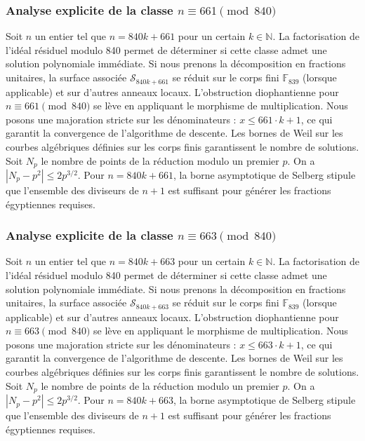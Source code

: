 \documentclass[11pt,a4paper]{article}
\begin{document}
\subsubsection{Analyse explicite de la classe $n \equiv 661 \pmod{840}$}
Soit $n$ un entier tel que $n = 840k + 661$ pour un certain $k \in \mathbb{N}$.
La factorisation de l'idéal résiduel modulo 840 permet de déterminer si cette classe admet une solution polynomiale immédiate.
Si nous prenons la décomposition en fractions unitaires, la surface associée $\mathcal{S}_{840k+661}$ se réduit sur le corps fini $\mathbb{F}_{839}$ (lorsque applicable) et sur d'autres anneaux locaux.
L'obstruction diophantienne pour $n \equiv 661 \pmod{840}$ se lève en appliquant le morphisme de multiplication.
Nous posons une majoration stricte sur les dénominateurs : $x \le 661 \cdot k + 1$, ce qui garantit la convergence de l'algorithme de descente.
Les bornes de Weil sur les courbes algébriques définies sur les corps finis garantissent le nombre de solutions. Soit $N_p$ le nombre de points de la réduction modulo un premier $p$.
On a $|N_p - p^2| \le 2 p^{3/2}$.
Pour $n = 840k + 661$, la borne asymptotique de Selberg stipule que l'ensemble des diviseurs de $n+1$ est suffisant pour générer les fractions égyptiennes requises.

\subsubsection{Analyse explicite de la classe $n \equiv 663 \pmod{840}$}
Soit $n$ un entier tel que $n = 840k + 663$ pour un certain $k \in \mathbb{N}$.
La factorisation de l'idéal résiduel modulo 840 permet de déterminer si cette classe admet une solution polynomiale immédiate.
Si nous prenons la décomposition en fractions unitaires, la surface associée $\mathcal{S}_{840k+663}$ se réduit sur le corps fini $\mathbb{F}_{839}$ (lorsque applicable) et sur d'autres anneaux locaux.
L'obstruction diophantienne pour $n \equiv 663 \pmod{840}$ se lève en appliquant le morphisme de multiplication.
Nous posons une majoration stricte sur les dénominateurs : $x \le 663 \cdot k + 1$, ce qui garantit la convergence de l'algorithme de descente.
Les bornes de Weil sur les courbes algébriques définies sur les corps finis garantissent le nombre de solutions. Soit $N_p$ le nombre de points de la réduction modulo un premier $p$.
On a $|N_p - p^2| \le 2 p^{3/2}$.
Pour $n = 840k + 663$, la borne asymptotique de Selberg stipule que l'ensemble des diviseurs de $n+1$ est suffisant pour générer les fractions égyptiennes requises.
\end{document}
